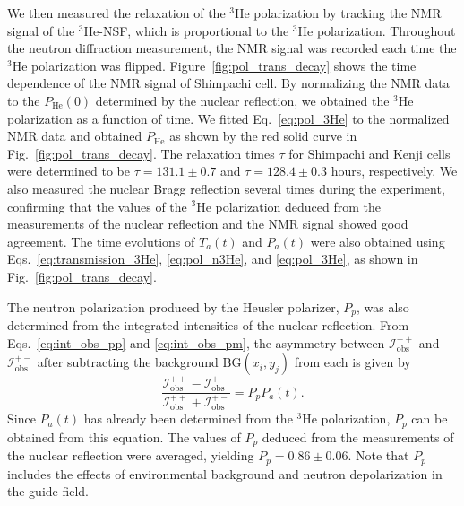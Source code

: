 \documentclass[%
 reprint,
superscriptaddress,
 amsmath,amssymb,
 aps,
floatfix,
]{revtex4-2}
\newcommand{\He}{$^3$He }
\newcommand{\Hensf}{$^3$He-NSF}
\begin{document}
We then measured the relaxation of the \He polarization by tracking the NMR signal of the \Hensf, which is proportional to the \He polarization.
Throughout the neutron diffraction measurement, the NMR signal was recorded each time the \He polarization was flipped.
Figure~\ref{fig:pol_trans_decay} shows the time dependence of the NMR signal of Shimpachi cell.
By normalizing the NMR data to the $P_\mathrm{He}(0)$ determined by the nuclear reflection, we obtained the \He polarization as a function of time.
We fitted Eq.~\ref{eq:pol_3He} to the normalized NMR data and obtained $P_\mathrm{He}$ as shown by the red solid curve in Fig.~\ref{fig:pol_trans_decay}.
The relaxation times $\tau$ for Shimpachi and Kenji cells were determined to be $\tau = 131.1 \pm 0.7$ and $\tau = 128.4 \pm 0.3$ hours, respectively.
We also measured the nuclear Bragg reflection several times during the experiment, confirming that the values of the \He polarization deduced from the measurements of the nuclear reflection and the NMR signal showed good agreement. %
The time evolutions of $T_a(t)$ and $P_a(t)$ were also obtained using Eqs.~\ref{eq:transmission_3He}, \ref{eq:pol_n3He}, and \ref{eq:pol_3He}, as shown in Fig.~\ref{fig:pol_trans_decay}.

The neutron polarization produced by the Heusler polarizer, $P_p$, was also determined from the integrated intensities of the nuclear reflection.
From Eqs.~\ref{eq:int_obs_pp} and \ref{eq:int_obs_pm}, the asymmetry between $\mathcal{I}^{++}_\mathrm{obs}$ and $\mathcal{I}^{+-}_\mathrm{obs}$ after subtracting the background $\mathrm{BG}(x_i, y_j)$ from each is given by
\begin{equation}
    \frac{\mathcal{I}^{++}_\mathrm{obs}-\mathcal{I}^{+-}_\mathrm{obs}}{\mathcal{I}^{++}_\mathrm{obs}+\mathcal{I}^{+-}_\mathrm{obs}} = P_pP_a(t).
\end{equation}
Since $P_a(t)$ has already been determined from the \He polarization, $P_p$ can be obtained from this equation.
The values of $P_p$ deduced from the measurements of the nuclear reflection were averaged, yielding $P_p = 0.86 \pm 0.06$.
Note that $P_p$ includes the effects of environmental background and neutron depolarization in the guide field.
\end{document}
